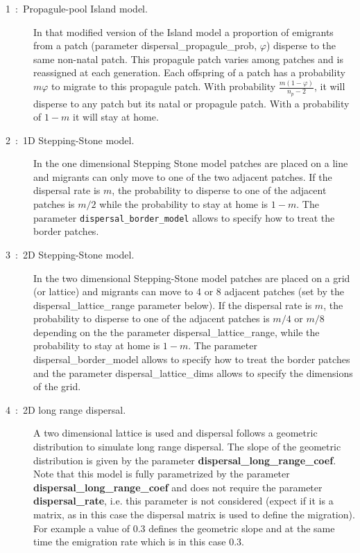 \documentclass[letterpaper,12pt,oneside]{book}
\begin{document}
\begin{description}
\begin{description}
\item[1~:~Propagule-pool Island model.] In that modified version of the Island model a proportion of emigrants from a patch (parameter \textsf{dispersal\_propagule\_prob}, $\varphi$) disperse to the same non-natal patch. This propagule patch varies among patches and is reassigned at each generation. Each offspring of a patch has a probability $m\varphi$ to migrate to this propagule patch. With probability $\frac{m(1-\varphi)}{n_{p}-2}$, it will disperse to any patch but its natal or propagule patch. With a probability of $1-m$ it will stay at home.

\item[2~:~1D Stepping-Stone model.] In the one dimensional Stepping Stone model patches are placed on a line and migrants can only move to one of the two adjacent patches. If the dispersal rate is $m$, the probability to disperse to one of the adjacent patches is $m/2$ while the probability to stay at home is $1-m$. The parameter \texttt{dispersal\_border\_model} allows to specify how to treat the border patches.   

\item[3~:~2D Stepping-Stone model.] In the two dimensional Stepping-Stone model patches are placed on a grid (or lattice) and migrants can move to 4 or 8 adjacent patches (set by the \textsf{dispersal\_lattice\_range} parameter below). If the dispersal rate is $m$, the probability to disperse to one of the adjacent patches is $m/4$ or $m/8$ depending on the the parameter \textsf{dispersal\_lattice\_range}, while the probability to stay at home is $1-m$. The parameter \textsf{dispersal\_border\_model} allows to specify how to treat the border patches and the parameter \textsf{dispersal\_lattice\_dims} allows to specify the dimensions of the grid.   

\item[4~:~2D long range dispersal.] A two dimensional lattice is used and dispersal follows a geometric distribution to simulate long range dispersal. The slope of the geometric distribution is given by the parameter \textbf{dispersal\_long\_range\_coef}. Note that this model is fully parametrized by the parameter \textbf{dispersal\_long\_range\_coef} and does not require the parameter \textbf{dispersal\_rate}, i.e. this parameter is not considered (expect if it is a matrix, as in this case the dispersal matrix is used to define the migration). For example a value of 0.3 defines the geometric slope and at the same time the emigration rate which is in this case 0.3.
\end{description}


\end{description}
\end{document}
